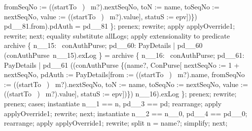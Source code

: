 \begin{LPScript}
\begin{zproof}[lPromotedAuxWorldStartToType]
                        fromSeqNo := ((startTo~ \inv)~ m?).nextSeqNo, 
                        toN := name, toSeqNo := nextSeqNo,
                    	value := ((startTo~ \inv)~ m?).value],
                    statuS := epv])\}) pd\_\_81.from).pdAuth = pd\_\_81 \};
        prenex;
        rewrite;
        apply applyOverride1;
        rewrite;
    next;
        equality substitute allLogs;
        apply extensionality to predicate
            archive \cup \{ n\_\_15: \dom~conAuthPurse; pd\_\_60: PayDetails
                | pd\_\_60 \in (conAuthPurse~n\_\_15).exLog \}
            = archive \cup \{ n\_\_16: \dom~conAuthPurse; pd\_\_61: PayDetails
                | pd\_\_61 \in ((conAuthPurse \oplus \{(name?, \theta ConPurse[
                    nextSeqNo := 1 + nextSeqNo,
                    pdAuth := \theta PayDetails[from := ((startTo~ \inv)~ m?).name,
                        fromSeqNo := ((startTo~ \inv)~ m?).nextSeqNo, 
                        toN := name, toSeqNo := nextSeqNo,
                    	value := ((startTo~ \inv)~ m?).value],
                    statuS := epv])\}) n\_\_16).exLog \};
        prenex;
        rewrite;
        prenex;
        cases;
            instantiate n\_\_1 == n, pd\_\_3 == pd;
            rearrange;
            apply applyOverride1;
            rewrite;
        next;
            instantiate n\_\_2 == n\_\_0, pd\_\_4 == pd\_\_0;
            rearrange;
            apply applyOverride1;
            rewrite;
            split \lnot n = name?;
            simplify;
    next;
\end{zproof}\end{LPScript}

